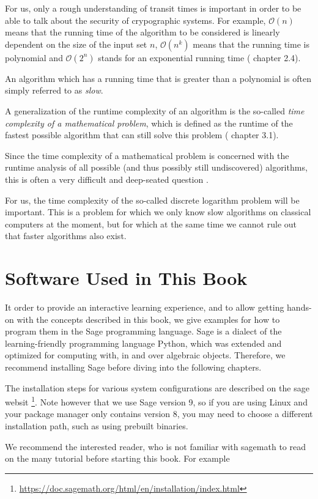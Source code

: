 For us, only a rough understanding of transit times is important in order to be able to talk about the security of crypographic systems. For example, $\mathcal{O}(n)$ means that the running time of the algorithm to be considered is linearly dependent on the size of the input set $n$, $\mathcal{O}(n^k)$ means that the running time is polynomial and $\mathcal{O}(2^n) $ stands for an exponential running time (%
chapter 2.4).


An algorithm which has a running time that is greater than a polynomial is often simply referred to as \textit{slow}.

A generalization of the runtime complexity of an algorithm is the so-called \textit{time complexity of a mathematical problem}, which is defined as the runtime of the fastest possible algorithm that can still solve this problem (
chapter 3.1).

Since the time complexity of a mathematical problem is concerned with the runtime analysis of all possible (and thus possibly still undiscovered) algorithms, this is often a very difficult and deep-seated question .

For us, the time complexity of the so-called discrete logarithm problem will be important. This is a problem for which we only know slow algorithms on classical computers at the moment, but for which at the same time we cannot rule out that faster algorithms also exist.

\section{Software Used in This Book}

It order to provide an interactive learning experience, and to allow getting hands-on with the concepts described in this book, we give examples for how to program them in the Sage programming language. Sage is a dialect of the learning-friendly programming language Python, which was extended and optimized for computing with, in and over algebraic objects. Therefore, we recommend installing Sage before diving into the following chapters.

The installation steps for various system configurations are described on the sage websit \footnote{\url{https://doc.sagemath.org/html/en/installation/index.html}}. Note however that we use Sage version 9, so if you are using Linux and your package manager only contains version 8, you may need to choose a different installation path, such as using prebuilt binaries.

We recommend the interested reader, who is not familiar with sagemath to read on the many tutorial before starting this book. For example 



